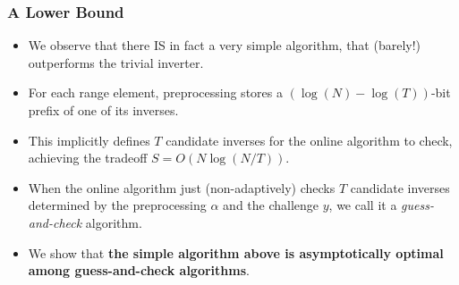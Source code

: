 \documentclass[usenames, dvipsnames, t, table]{beamer}
\begin{document}
  \begin{frame}
    \frametitle{A Lower Bound}
    \begin{itemize}
    \item We observe that there IS in fact a very simple algorithm, that (barely!) outperforms the trivial inverter.
      \pause
    \item For each range element, preprocessing stores a $(\log(N) - \log(T))$-bit prefix of one of its inverses.
      \pause
    \item This implicitly defines $T$ candidate inverses for the online algorithm to check, achieving the tradeoff $S = O(N \log (N / T))$.
          \mypause
        \item When the online algorithm just (non-adaptively)  checks $T$ candidate inverses determined by the preprocessing $\alpha$ and the challenge $y$, we call it a \emph{guess-and-check} algorithm.
          \pause
    \item
      We show that \textbf{the simple algorithm above is asymptotically optimal among guess-and-check algorithms}.
    \end{itemize}
  \end{frame}
\end{document}
